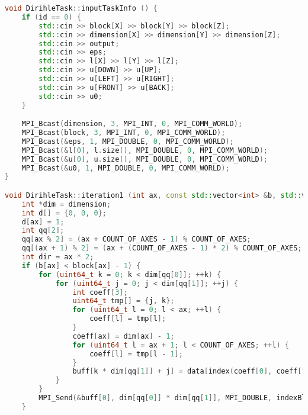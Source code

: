 \begin{lstlisting}[basicstyle=\normalfont, language=C++]
void DirihleTask::inputTaskInfo () {
    if (id == 0) {
        std::cin >> block[X] >> block[Y] >> block[Z];
        std::cin >> dimension[X] >> dimension[Y] >> dimension[Z];
        std::cin >> output;
        std::cin >> eps;
        std::cin >> l[X] >> l[Y] >> l[Z];
        std::cin >> u[DOWN] >> u[UP];
        std::cin >> u[LEFT] >> u[RIGHT];
        std::cin >> u[FRONT] >> u[BACK];
        std::cin >> u0;
    }

    MPI_Bcast(dimension, 3, MPI_INT, 0, MPI_COMM_WORLD);
    MPI_Bcast(block, 3, MPI_INT, 0, MPI_COMM_WORLD);
    MPI_Bcast(&eps, 1, MPI_DOUBLE, 0, MPI_COMM_WORLD);
    MPI_Bcast(&l[0], l.size(), MPI_DOUBLE, 0, MPI_COMM_WORLD);
    MPI_Bcast(&u[0], u.size(), MPI_DOUBLE, 0, MPI_COMM_WORLD);
    MPI_Bcast(&u0, 1, MPI_DOUBLE, 0, MPI_COMM_WORLD);
}

void DirihleTask::iteration1 (int ax, const std::vector<int> &b, std::vector<double> &buff, std::vector<double> &data) {
    int *dim = dimension;
    int d[] = {0, 0, 0};
    d[ax] = 1;
    int qq[2];
    qq[ax % 2] = (ax + COUNT_OF_AXES - 1) % COUNT_OF_AXES;
    qq[(ax + 1) % 2] = (ax + (COUNT_OF_AXES - 1) * 2) % COUNT_OF_AXES;
    int dir = ax * 2;
    if (b[ax] < block[ax] - 1) {
        for (uint64_t k = 0; k < dim[qq[0]]; ++k) {
            for (uint64_t j = 0; j < dim[qq[1]]; ++j) {
                int coeff[3];
                uint64_t tmp[] = {j, k};
                for (uint64_t l = 0; l < ax; ++l) {
                    coeff[l] = tmp[l];
                }
                coeff[ax] = dim[ax] - 1;
                for (uint64_t l = ax + 1; l < COUNT_OF_AXES; ++l) {
                    coeff[l] = tmp[l - 1];
                }
                buff[k * dim[qq[1]] + j] = data[index(coeff[0], coeff[1], coeff[2], dim)];
            }
        }
        MPI_Send(&buff[0], dim[qq[0]] * dim[qq[1]], MPI_DOUBLE, indexBlock(b[X] + d[X], b[Y] + d[Y], b[Z] + d[Z], block), id, MPI_COMM_WORLD);
    }


\end{lstlisting}
